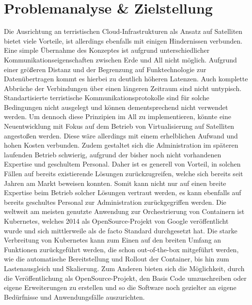 \documentclass[
  ngerman,
  symmetric,
  cdfont=on,
  numbers=noenddot,
  parskip
]{tudscrreprt}
\begin{document}
\section{Problemanalyse \& Zielstellung}
Die Ausrichtung an terristischen Cloud-Infrastrukturen als Ansatz auf Satelliten bietet viele Vorteile, 
ist allerdings ebenfalls mit einigen Hindernissen verbunden. Eine simple Übernahme des Konzeptes ist aufgrund unterschiedlicher Kommunikationseigenschaften zwischen Erde und All nicht möglich. Aufgrund einer größeren Distanz und der Begrenzung auf Funktechnologie zur Datenübertragen kommt es hierbei zu deutlich höheren Latenzen. Auch komplette Abbrüche der Verbindungen über einen längeren Zeitraum sind nicht untypisch. Standartisierte terristische Kommunikationsprotokolle sind für solche Bedingungen nicht ausgelegt und können dementsprechend nicht verwendet werden. 
Um dennoch diese Prinzipien im All zu implementieren, könnte eine Neuentwicklung mit Fokus auf dem Betrieb 
von Virtualisierung auf Satelliten angestoßen werden. Diese wäre allerdings mit einem erhelblichen Aufwand und hohen Kosten verbunden. Zudem gestaltet sich die Administration im späteren laufenden 
Betrieb schwierig, aufgrund der bisher noch nicht vorhandenen Expertise und geschultem Personal. Daher ist es generell von Vorteil, in solchen Fällen auf bereits existierende Lösungen zurückzugreifen, welche sich bereits seit Jahren am Markt beweisen konnten. Somit kann nicht nur auf einen breite Expertise beim Betrieb solcher Lösungen vertraut werden, es kann ebenfalls auf bereits geschultes Personal zur Administration zurückgegriffen werden. 
Die weltweit am meisten genutzte Anwendung zur Orchestrierung von Containern ist Kubernetes, welches 2014 als OpenSource-Projekt von Google veröffentlicht wurde und sich mittlerweile als de facto Standard durchgesetzt hat. Die starke Verbreitung von Kubernetes kann zum Einen auf den breiten Umfang an Funktionen zurückgeführt werden, die schon out-of-the-box mitgeführt werden, wie die automatische Bereitstellung und Rollout der Container, bis hin zum Lastenausgleich und Skalierung. Zum Anderen bieten sich die Möglichkeit, durch die Veröffentlichung als OpenSource-Projekt, den Basis Code umzuschreiben oder eigene Erweiterungen zu erstellen und so die Software noch gezielter an eigene Bedürfnisse und Anwendungsfälle auszurichten. 
\end{document}
